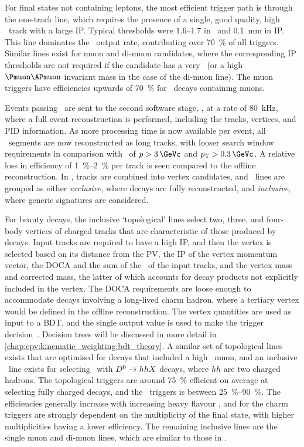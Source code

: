 For final states not containing leptons, the most efficient trigger path is 
through the one-track line, which requires the presence of a single, good 
quality, high \pT\ track with a large \ac{IP}.
Typical thresholds were $1.6$--\SI{1.7}{\GeVc} in \pT\ and 
\SI{0.1}{\milli\metre} in \ac{IP}.
This line dominates the \hltone\ output rate, contributing over 
\SI{70}{\percent} of all triggers.
Similar lines exist for muon and di-muon candidates, where the corresponding 
\ac{IP} thresholds are not required if the candidate has a very \pT\ (or a high 
$\Pmuon\APmuon$ invariant mass in the case of the di-muon line).
The muon triggers have efficiencies upwards of \SI{70}{\percent} for \PB\ 
decays containing muons.

Events passing \hltone\ are sent to the second software stage, \hlttwo, at a 
rate of \SI{80}{\kilo\hertz}, where a full event reconstruction is performed, 
including the tracks, vertices, and \ac{PID} information.
As more processing time is now available per event, all \velo\ segments are now 
reconstructed as long tracks, with looser search window requirements in 
comparison with \hltone\ of $\ptot > \SI{3}{\GeVc}$ and $\pT > 
\SI{0.3}{\GeVc}$.
A relative loss in efficiency of \SIrange{1}{2}{\percent} per track is seen 
compared to the offline reconstruction.
In \hlttwo, tracks are combined into vertex candidates, and \hlttwo\ lines are 
grouped as either \emph{exclusive}, where decays are fully reconstructed, and 
\emph{inclusive}, where generic signatures are considered.

For beauty decays, the inclusive `topological' lines select two, three, and 
four-body vertices of charged tracks that are characteristic of those produced 
by \PB decays.
Input tracks are required to have a high \ac{IP}, and then the vertex is 
selected based on its distance from the \ac{PV}, the \ac{IP} of the vertex 
momentum vector, the \ac{DOCA} and the sum of the \pT\ of the input tracks, and 
the vertex mass and corrected mass, the latter of which accounts for decay 
products not explicitly included in the vertex.
The \ac{DOCA} requirements are loose enough to accommodate \PB decays involving 
a long-lived charm hadron, where a tertiary vertex would be defined in the 
offline reconstruction.
The vertex quantities are used as input to a \ac{BDT}, and the single output 
value is used to make the trigger 
decision~\cite{Gligorov:2011qxa,Gligorov:1384380}.
Decision trees will be discussed in more detail in 
\cref{chap:cpv:kinematic_weighting:bdt_theory}.
A similar set of topological lines exists that are optimised for \PB decays 
that included a high \pT\ muon, and an inclusive \PDstarp\ line exists for 
selecting \DstToDzpi\ with $D^{0} \to hhX$ decays, where $hh$ are two 
charged hadrons.
The topological \PB triggers are around \SI{75}{\percent} efficient on average 
at selecting fully charged \PB decays, and the \PDstarp\ triggers is between 
\SIrange{25}{90}{\percent}.
The efficiencies generally increase with increasing heavy flavour \pT, and for 
the charm triggers are strongly dependent on the multiplicity of the final 
state, with higher multiplicities having a lower efficiency.
The remaining inclusive lines are the single muon and di-muon lines, which are 
similar to those in \hltone.

